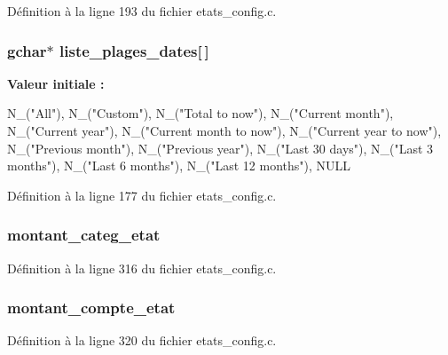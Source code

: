 Définition à la ligne 193 du fichier etats\_\-config.c.

\subsubsection[{liste\_\-plages\_\-dates}]{\setlength{\rightskip}{0pt plus 5cm}gchar$\ast$ {\bf liste\_\-plages\_\-dates}[$\,$]}\label{etats__config_8c_ab8e3ed1424ff4242d1e9df58aad68eb1}
{\bfseries Valeur initiale :}
\begin{DoxyCode}
 {
    N_("All"),
    N_("Custom"),
    N_("Total to now"),
    N_("Current month"),
    N_("Current year"),
    N_("Current month to now"),
    N_("Current year to now"),
    N_("Previous month"),
    N_("Previous year"),
    N_("Last 30 days"),
    N_("Last 3 months"),
    N_("Last 6 months"),
    N_("Last 12 months"),
    NULL }
\end{DoxyCode}


Définition à la ligne 177 du fichier etats\_\-config.c.

\subsubsection[{montant\_\-categ\_\-etat}]{ {\bf montant\_\-categ\_\-etat}}\label{etats__config_8c_afc4d1cbfa38b987f27933ddccd51598b}


Définition à la ligne 316 du fichier etats\_\-config.c.

\subsubsection[{montant\_\-compte\_\-etat}]{ {\bf montant\_\-compte\_\-etat}}\label{etats__config_8c_ae5577643c4652cb316b536fe589be57a}


Définition à la ligne 320 du fichier etats\_\-config.c.

